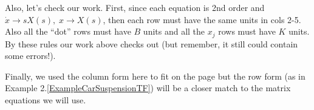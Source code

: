 Also, let's check our work.   First, since each equation is 2nd order
and $\dot{x} \to sX(s), \; x \to X(s)$, then each row must have the same
units in cols 2-5.   Also all the ``dot'' rows must have $B$ units
and all the $x_j$ rows must have $K$ units.   By these rules  our work
above checks out (but remember, it still could contain some errors!).

Finally,  we used the column form here
to fit on the page but the row form (as in Example
2.\ref{ExampleCarSuspensionTF}) will be a closer match to the matrix equations
we will use.
